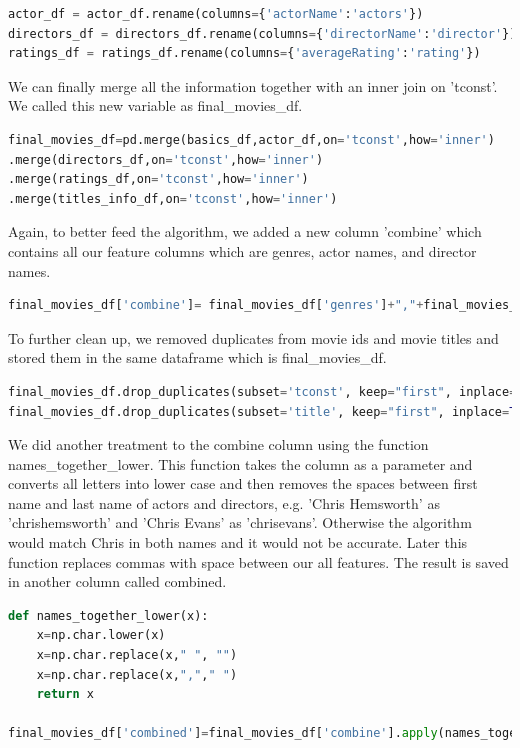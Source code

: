 \begin{lstlisting}[language=python]
actor_df = actor_df.rename(columns={'actorName':'actors'})
directors_df = directors_df.rename(columns={'directorName':'director'})
ratings_df = ratings_df.rename(columns={'averageRating':'rating'})
\end{lstlisting}

We can finally merge all the information together with an inner join on 'tconst'. We called this new variable as final\_movies\_df. 

\begin{lstlisting}[language=python]
final_movies_df=pd.merge(basics_df,actor_df,on='tconst',how='inner')
.merge(directors_df,on='tconst',how='inner')
.merge(ratings_df,on='tconst',how='inner')
.merge(titles_info_df,on='tconst',how='inner')
\end{lstlisting}

Again, to better feed the algorithm, we added a new column 'combine' which contains all our feature columns which are genres, actor names, and director names.

\begin{lstlisting}[language=python]
final_movies_df['combine']= final_movies_df['genres']+","+final_movies_df['actors']+","+final_movies_df['director']
\end{lstlisting}

To further clean up, we removed duplicates from movie ids and movie titles and stored them in the same dataframe which is final\_movies\_df.

\begin{lstlisting}[language=python]
final_movies_df.drop_duplicates(subset='tconst', keep="first", inplace=True)
final_movies_df.drop_duplicates(subset='title', keep="first", inplace=True)
\end{lstlisting}

We did another treatment to the combine column using the function names\_together\_lower. This function takes the column as a parameter and converts all letters into lower case and then removes the spaces between first name and last name of actors and directors, e.g. 'Chris Hemsworth' as 'chrishemsworth' and 'Chris Evans' as 'chrisevans'. Otherwise the algorithm would match Chris in both names and it would not be accurate. Later this function replaces commas with space between our all features. The result is saved in another column called combined.

\begin{lstlisting}[language=python]
def names_together_lower(x):
    x=np.char.lower(x)
    x=np.char.replace(x," ", "")
    x=np.char.replace(x,","," ")
    return x

final_movies_df['combined']=final_movies_df['combine'].apply(names_together_lower)
\end{lstlisting}

